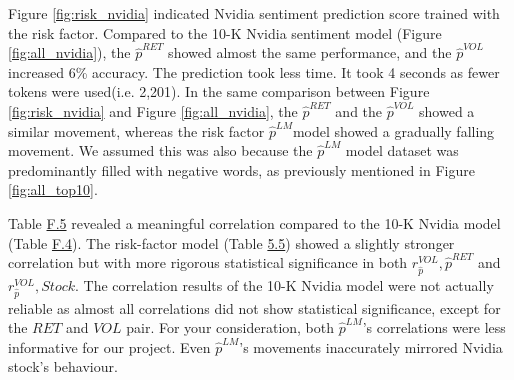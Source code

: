 \documentclass[logo,bsc,singlespacing,parskip]{infthesis}
\begin{document}






Figure \ref{fig:risk_nvidia} indicated Nvidia sentiment prediction score trained with the risk factor. Compared to the 10-K Nvidia sentiment model (Figure \ref{fig:all_nvidia}), the $\hat{p}^{RET}$ showed almost the same performance, and the $\hat{p}^{VOL}$ increased 6\% accuracy. The prediction took less time. It took 4 seconds as fewer tokens were used(i.e. 2,201). In the same comparison between Figure \ref{fig:risk_nvidia} and Figure \ref{fig:all_nvidia}, the $\hat{p}^{RET}$ and the  $\hat{p}^{VOL}$ showed a similar movement, whereas the risk factor $\hat{p}^{LM}$model showed a gradually falling movement. We assumed this was also because the $\hat{p}^{LM}$ model dataset was predominantly filled with negative words, as previously mentioned in Figure \ref{fig:all_top10}.

Table \hyperref[tab:risk_nvidia_corr]{F.5} revealed a meaningful correlation compared to the 10-K Nvidia model (Table \hyperref[tab:all_nvidia_corr]{F.4}). The risk-factor model (Table \hyperref[tab:risk_nvidia_corr]{5.5}) showed a slightly stronger correlation but with more rigorous statistical significance in both $r_\hat{p}^{VOL},\hat{p}^{RET}$ and $r_\hat{p}^{VOL},Stock$. The correlation results of the 10-K Nvidia model were not actually reliable as almost all correlations did not show statistical significance, except for the $RET$ and $VOL$ pair. For your consideration, both $\hat{p}^{LM}$'s correlations were less informative for our project. Even $\hat{p}^{LM}$'s movements inaccurately mirrored Nvidia stock's behaviour. 
\end{document}
